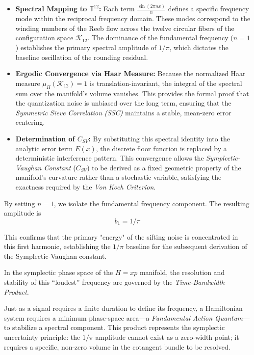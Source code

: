 \documentclass[sn-mathphys-num, pdflatex, referee]{sn-jnl}
\begin{document}
\begin{itemize}
    \item \textbf{Spectral Mapping to $\mathbb{T}^{12}$:} Each term $\frac{\sin(2\pi nx)}{n}$ defines a specific frequency mode within the reciprocal frequency domain. These modes correspond to the winding numbers of the Reeb flow across the twelve circular fibers of the configuration space $\mathcal{K}_{12}$. The dominance of the fundamental frequency ($n=1$) establishes the primary spectral amplitude of $1/\pi$, which dictates the baseline oscillation of the rounding residual.
    
    \item \textbf{Ergodic Convergence via Haar Measure:} Because the normalized Haar measure $\mu_H(\mathcal{K}_{12})=1$ is translation-invariant, the integral of the spectral sum over the manifold's volume vanishes. This provides the formal proof that the quantization noise is unbiased over the long term, ensuring that the \textit{Symmetric Sieve Correlation (SSC)} maintains a stable, mean-zero error centering.
    
    \item \textbf{Determination of $C_{SV}$:} By substituting this spectral identity into the analytic error term $E(x)$, the discrete floor function is replaced by a deterministic interference pattern. This convergence allows the \textit{Symplectic-Vaughan Constant} ($C_{SV}$) to be derived as a fixed geometric property of the manifold's curvature rather than a stochastic variable, satisfying the exactness required by the \textit{Von Koch Criterion}.
\end{itemize}
By setting $n=1$, we isolate the fundamental frequency component. The resulting amplitude is $$b_1 = 1/\pi$$ 

This confirms that the primary "energy" of the sifting noise is concentrated in this first harmonic, establishing the $1/\pi$ baseline for the subsequent derivation of the Symplectic-Vaughan constant. 

In the symplectic phase space of the $H=xp$ manifold, the resolution and stability of this ``loudest'' frequency are governed by the \textit{Time-Bandwidth Product}. 

Just as a signal requires a finite duration to define its frequency, a Hamiltonian system requires a minimum phase-space area---a \textit{Fundamental Action Quantum}---to stabilize a spectral component. This product represents the symplectic uncertainty principle: the $1/\pi$ amplitude cannot exist as a zero-width point; it requires a specific, non-zero volume in the cotangent bundle to be resolved. 
\end{document}
